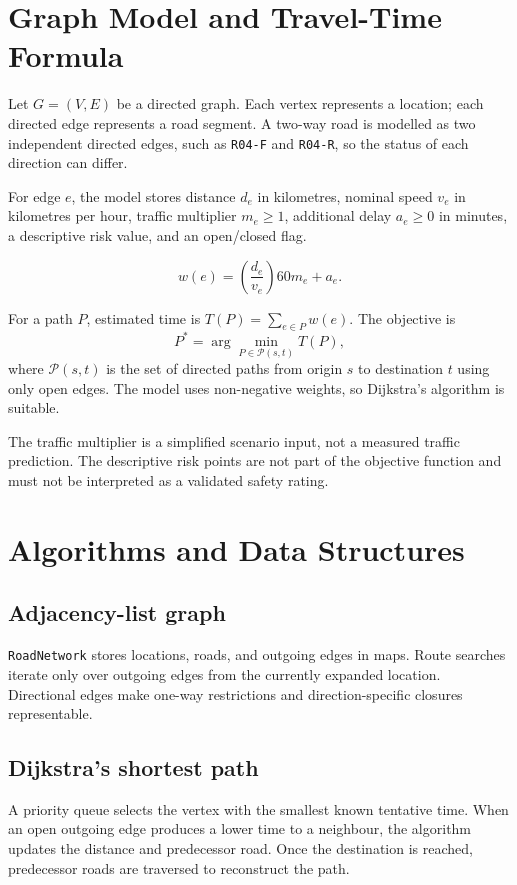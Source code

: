 \documentclass[11pt,a4paper]{article}
\begin{document}
\section{Graph Model and Travel-Time Formula}
Let $G=(V,E)$ be a directed graph. Each vertex represents a location; each directed edge represents a road segment. A two-way road is modelled as two independent directed edges, such as \texttt{R04-F} and \texttt{R04-R}, so the status of each direction can differ.

For edge $e$, the model stores distance $d_e$ in kilometres, nominal speed $v_e$ in kilometres per hour, traffic multiplier $m_e\geq1$, additional delay $a_e\geq0$ in minutes, a descriptive risk value, and an open/closed flag.

\[
  w(e)=\left(\frac{d_e}{v_e}\right)60m_e+a_e.
\]

For a path $P$, estimated time is $T(P)=\sum_{e\in P}w(e)$. The objective is
\[
  P^*=\arg\min_{P\in\mathcal{P}(s,t)} T(P),
\]
where $\mathcal{P}(s,t)$ is the set of directed paths from origin $s$ to destination $t$ using only open edges. The model uses non-negative weights, so Dijkstra's algorithm is suitable.

The traffic multiplier is a simplified scenario input, not a measured traffic prediction. The descriptive risk points are not part of the objective function and must not be interpreted as a validated safety rating.

\section{Algorithms and Data Structures}
\subsection{Adjacency-list graph}
\texttt{RoadNetwork} stores locations, roads, and outgoing edges in maps. Route searches iterate only over outgoing edges from the currently expanded location. Directional edges make one-way restrictions and direction-specific closures representable.

\subsection{Dijkstra's shortest path}
A priority queue selects the vertex with the smallest known tentative time. When an open outgoing edge produces a lower time to a neighbour, the algorithm updates the distance and predecessor road. Once the destination is reached, predecessor roads are traversed to reconstruct the path.
\end{document}
